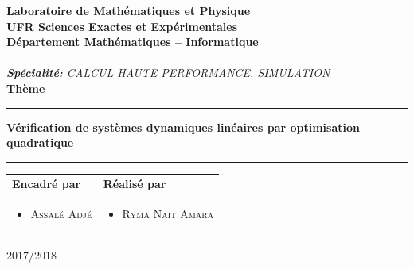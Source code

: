 \begin{titlepage}
\begin{center}
{\bf {\large  Laboratoire de Math\'{e}matiques et Physique }}\\
 
{\bf   UFR Sciences Exactes et Exp\'{e}rimentales } \\

{ \textbf{D\'{e}partement Math\'{e}matiques – Informatique}}\\ \vspace{0.8cm}
 \\\vspace{0.3cm}
\large{\emph{\textbf{Spécialité:} CALCUL HAUTE PERFORMANCE, SIMULATION}}\\ \vspace{0.8cm}
\huge{\textbf{Thème}}\\ %
\noindent\rule{\textwidth}{1mm}
\Large{\textbf{Vérification de systèmes dynamiques linéaires par
optimisation quadratique}}
\noindent\rule{\textwidth}{1mm}
\end{center}
\vspace{0.3cm}
\begin{tabular}{ p{9cm}  p{6cm} }
\textbf{Encadré par} & \textbf{Réalisé par} \\
\begin{itemize}
	\item \textsc{Assalé Adjé} 
\end{itemize}
&
\begin{itemize}
	\item \textsc{Ryma Nait Amara} 
	
\end{itemize}
\\
\end{tabular}
\vspace{3.5cm}
\begin{center}
2017/2018
\end{center}

\end{titlepage}

\newpage






